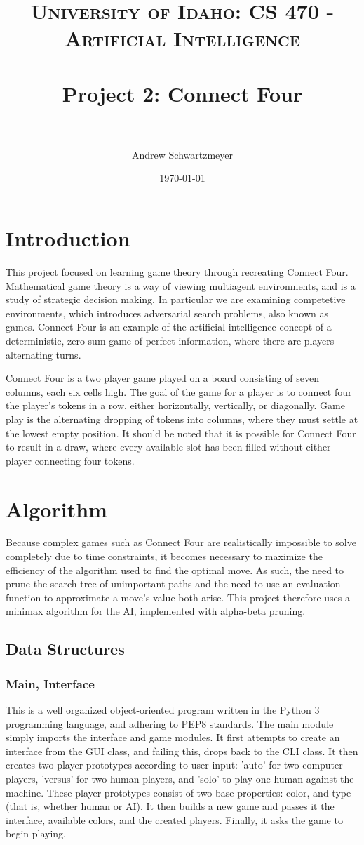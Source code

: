 \documentclass[12pt, article]{scrartcl}
\title{	
\normalfont \normalsize 
\textsc{University of Idaho: CS 470 - Artificial Intelligence} \\ [25pt]
\horrule{0.5pt} \\[0.4cm]
\huge Project 2: Connect Four\\
\horrule{2pt} \\[0.5cm]
}
\author{Andrew Schwartzmeyer}
\date{\normalsize\today}
\begin{document}
\maketitle 
\begin{abstract}
\end{abstract}
\pagebreak
\section{Introduction}
This project focused on learning game theory through recreating Connect Four. Mathematical game theory is a way of viewing multiagent environments, and is a study of strategic decision making. In particular we are examining competetive environments, which introduces adversarial search problems, also known as games. Connect Four is an example of the artificial intelligence concept of a deterministic, zero-sum game of perfect information, where there are players alternating turns.

Connect Four is a two player game played on a board consisting of seven columns, each six cells high. The goal of the game for a player is to connect four the player's tokens in a row, either horizontally, vertically, or diagonally. Game play is the alternating dropping of tokens into columns, where they must settle at the lowest empty position. It should be noted that it is possible for Connect Four to result in a draw, where every available slot has been filled without either player connecting four tokens.

\section{Algorithm}
Because complex games such as Connect Four are realistically impossible to solve completely due to time constraints, it becomes necessary to maximize the efficiency of the algorithm used to find the optimal move. As such, the need to prune the search tree of unimportant paths and the need to use an evaluation function to approximate a move's value both arise. This project therefore uses a minimax algorithm for the AI, implemented with alpha-beta pruning.

\subsection{Data Structures}
\subsubsection{Main, Interface}
This is a well organized object-oriented program written in the Python 3 programming language, and adhering to PEP8 standards. The main module simply imports the interface and game modules. It first attempts to create an interface from the GUI class, and failing this, drops back to the CLI class. It then creates two player prototypes according to user input: 'auto' for two computer players, 'versus' for two human players, and 'solo' to play one human against the machine. These player prototypes consist of two base properties: color, and type (that is, whether human or AI). It then builds a new game and passes it the interface, available colors, and the created players. Finally, it asks the game to begin playing.
\end{document}
